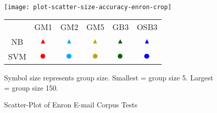 		
\paragraph*{}
	\begin{sidewaysfigure}[htbp!]
		\begin{center}
		\centering
		\texttt{[image: plot-scatter-size-accuracy-enron-crop]}
			
		\begin{tabular}{cccccc}
			
			  	& GM1	& GM2	& GM5	& GB3	& OSB3	\\
			NB	& $ \color{red} \blacktriangle$ & $\color{cyan} \blacktriangle$ & $\color{MyDarkYellow} \blacktriangle$ & $\color{MyOliveGreen} \blacktriangle$ & $\color{blue} \blacktriangle$ \\ 					
			SVM	& $ \color{red} \CIRCLE$ & $\color{cyan} \CIRCLE$ & $\color{MyDarkYellow} \CIRCLE$ & $\color{MyOliveGreen} \CIRCLE$ & $\color{blue} \CIRCLE$ \\
		\end{tabular}
		\begin{singlespace}
		Symbol size represents group size.  Smallest = group size 5.  Largest = group size 150.  
		\end{singlespace}
		\caption{Scatter-Plot of Enron E-mail Corpus Tests}
		\label{fig:plot-scatter-enron}
		\end{center}
	\end{sidewaysfigure}
	

